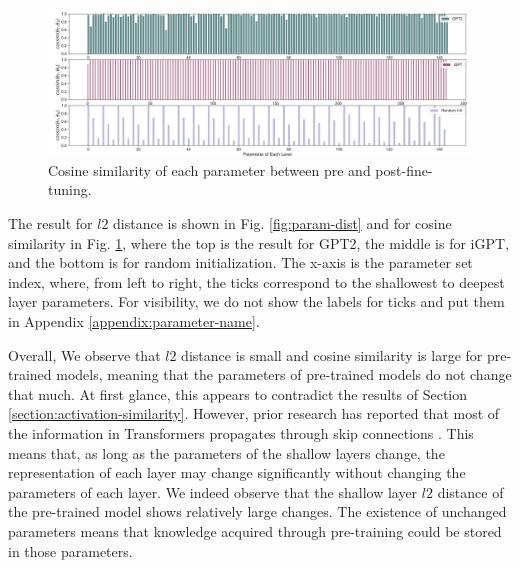 \begin{figure}[ht]
    \centering
        \includegraphics[width=\linewidth]{figs/paramcos_0_40_gpt2_igpt_dt_hopper_medium_666.pdf}
    \caption{Cosine similarity of each parameter between pre and post-fine-tuning.}
    \label{fig:param-cos}
\end{figure}

The result for $l2$ distance is shown in Fig. \ref{fig:param-dist} and for cosine similarity in Fig. \ref{fig:param-cos}, where the top is the result for GPT2, the middle is for iGPT, and the bottom is for random initialization. The x-axis is the parameter set index, where, from left to right, the ticks correspond to the shallowest to deepest layer parameters. For visibility, we do not show the labels for ticks and put them in Appendix \ref{appendix:parameter-name}. 

Overall, We observe that $l2$ distance is small and cosine similarity is large for pre-trained models, meaning that the parameters of pre-trained models do not change that much. At first glance, this appears to contradict the results of Section \ref{section:activation-similarity}. However, prior research has reported that most of the information in Transformers propagates through skip connections \cite{raghu2021vision}. This means that, as long as the parameters of the shallow layers change, the representation of each layer may change significantly without changing the parameters of each layer. We indeed observe that the shallow layer $l2$ distance of the pre-trained model shows relatively large changes. The existence of unchanged parameters means that knowledge acquired through pre-training could be stored in those parameters.

